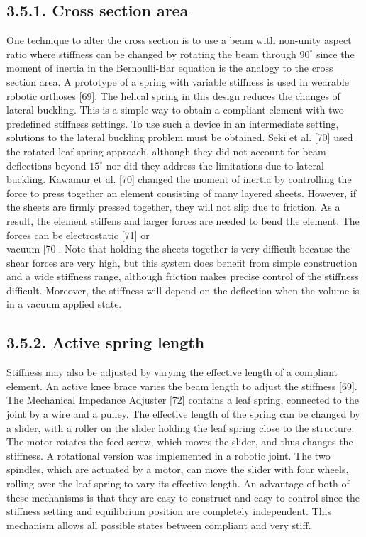 \documentclass[10pt]{article}
\begin{document}
\subsection*{3.5.1. Cross section area}
One technique to alter the cross section is to use a beam with non-unity aspect ratio where stiffness can be changed by rotating the beam through $90^{\circ}$ since the moment of inertia in the Bernoulli-Bar equation is the analogy to the cross section area. A prototype of a spring with variable stiffness is used in wearable robotic orthoses [69]. The helical spring in this design reduces the changes of lateral buckling. This is a simple way to obtain a compliant element with two predefined stiffness settings. To use such a device in an intermediate setting, solutions to the lateral buckling problem must be obtained. Seki et al. [70] used the rotated leaf spring approach, although they did not account for beam deflections beyond $15^{\circ}$ nor did they address the limitations due to lateral buckling. Kawamur et al. [70] changed the moment of inertia by controlling the force to press together an element consisting of many layered sheets. However, if the sheets are firmly pressed together, they will not slip due to friction. As a result, the element stiffens and larger forces are needed to bend the element. The forces can be electrostatic [71] or\\[0pt]
vacuum [70]. Note that holding the sheets together is very difficult because the shear forces are very high, but this system does benefit from simple construction and a wide stiffness range, although friction makes precise control of the stiffness difficult. Moreover, the stiffness will depend on the deflection when the volume is in a vacuum applied state.

\subsection*{3.5.2. Active spring length}
Stiffness may also be adjusted by varying the effective length of a compliant element. An active knee brace varies the beam length to adjust the stiffness [69]. The Mechanical Impedance Adjuster [72] contains a leaf spring, connected to the joint by a wire and a pulley. The effective length of the spring can be changed by a slider, with a roller on the slider holding the leaf spring close to the structure. The motor rotates the feed screw, which moves the slider, and thus changes the stiffness. A rotational version was implemented in a robotic joint. The two spindles, which are actuated by a motor, can move the slider with four wheels, rolling over the leaf spring to vary its effective length. An advantage of both of these mechanisms is that they are easy to construct and easy to control since the stiffness setting and equilibrium position are completely independent. This mechanism allows all possible states between compliant and very stiff.
\end{document}
